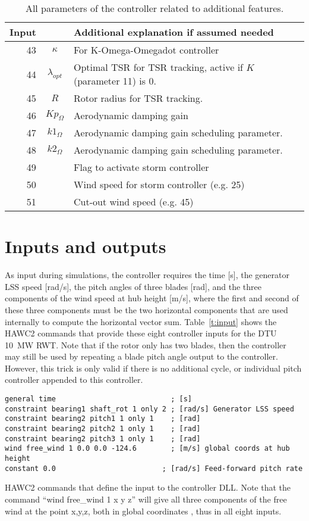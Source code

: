 \begin{table}[!htbp]
\begin{center}
\begin{tabular}{r|c|p{11.5cm}}
Input &  & Additional explanation if assumed needed \\ \hline
43 & $\kappa$ & For K-Omega-Omegadot controller\\
44 & $\lambda_{opt}$ & Optimal TSR for TSR tracking, active if $K$ (parameter 11) is 0.\\
45 & $R$ & Rotor radius for TSR tracking.\\
\hline
46 & $Kp_\Omega$ & Aerodynamic damping gain\\
47 & $k1_\Omega$ & Aerodynamic damping gain scheduling parameter.\\
48 & $k2_\Omega$ & Aerodynamic damping gain scheduling parameter.\\
\hline
49 &  & Flag to activate storm controller\\
50 &  & Wind speed for storm controller (e.g. 25)\\
51 &  & Cut-out wind speed (e.g. 45)
\end{tabular}
\caption{All parameters of the controller related to additional features.}
\label{t:par2}
\end{center}
\end{table}

\section{Inputs and outputs}

As input during simulations, the controller requires the time [s], the generator LSS speed [rad/s], the pitch angles of three blades [rad], and the three components of the wind speed at hub height [m/s], where the first and second of these three components must be the two horizontal components that are used internally to compute the horizontal vector sum. Table~\ref{t:input} shows the HAWC2 commands that provide these eight controller inputs for the DTU 10~MW RWT. Note that if the rotor only has two blades, then the controller may still be used by repeating a blade pitch angle output to the controller. However, this trick is only valid if there is no additional cycle, or individual pitch controller appended to this controller.

\begin{table}[t]
\center
\begin{verbatim}
general time                           ; [s]
constraint bearing1 shaft_rot 1 only 2 ; [rad/s] Generator LSS speed
constraint bearing2 pitch1 1 only 1    ; [rad]
constraint bearing2 pitch2 1 only 1    ; [rad]
constraint bearing2 pitch3 1 only 1    ; [rad]
wind free_wind 1 0.0 0.0 -124.6        ; [m/s] global coords at hub height
constant 0.0                         ; [rad/s] Feed-forward pitch rate
\end{verbatim}
\caption{HAWC2 commands that define the input to the controller DLL. Note that the command ``wind free\_wind 1 x y z'' will give all three components of the free wind at the point x,y,z, both in global coordinates \cite{Larsen12}, thus in all eight inputs. \label{t:input}}
\end{table}

